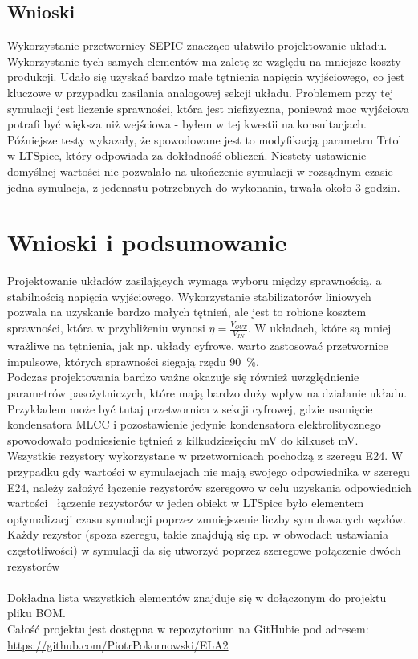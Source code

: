 \documentclass[11pt]{article}
\begin{document}
\subsection{Wnioski}
Wykorzystanie przetwornicy SEPIC znacząco ułatwiło projektowanie układu. Wykorzystanie tych samych elementów ma zaletę ze względu na mniejsze koszty produkcji. Udało się uzyskać bardzo małe tętnienia napięcia wyjściowego, co jest kluczowe w przypadku zasilania analogowej sekcji układu. Problemem przy tej symulacji jest liczenie sprawności, która jest niefizyczna, ponieważ moc wyjściowa potrafi być większa niż wejściowa - byłem w tej kwestii na konsultacjach. Późniejsze testy wykazały, że spowodowane jest to modyfikacją parametru Trtol w LTSpice, który odpowiada za dokładność obliczeń. Niestety ustawienie domyślnej wartości nie pozwalało na ukończenie symulacji w rozsądnym czasie - jedna symulacja, z jedenastu potrzebnych do wykonania, trwała około 3 godzin.

\section{Wnioski i podsumowanie}
Projektowanie układów zasilających wymaga wyboru między sprawnością, a stabilnością napięcia wyjściowego. Wykorzystanie stabilizatorów liniowych pozwala na uzyskanie bardzo małych tętnień, ale jest to robione kosztem sprawności, która w przybliżeniu wynosi $\eta = \frac{V_{OUT}}{V_{IN}}$. W układach, które są mniej wrażliwe na tętnienia, jak np. układy cyfrowe, warto zastosować przetwornice impulsowe, których sprawności sięgają rzędu \SI{90}{\percent}.\\
Podczas projektowania bardzo ważne okazuje się również uwzględnienie parametrów pasożytniczych, które mają bardzo duży wpływ na działanie układu. Przykładem może być tutaj przetwornica z sekcji cyfrowej, gdzie usunięcie kondensatora MLCC i pozostawienie jedynie kondensatora elektrolitycznego spowodowało podniesienie tętnień z kilkudziesięciu mV do kilkuset mV.\\
Wszystkie rezystory wykorzystane w przetwornicach pochodzą z szeregu E24. W przypadku gdy wartości w symulacjach nie mają swojego odpowiednika w szeregu E24, należy założyć łączenie rezystorów szeregowo w celu uzyskania odpowiednich wartości \textemdash \ łączenie rezystorów w jeden obiekt w LTSpice było elementem optymalizacji czasu symulacji poprzez zmniejszenie liczby symulowanych węzłów. Każdy rezystor (spoza szeregu, takie znajdują się np. w obwodach ustawiania częstotliwości) w symulacji da się utworzyć poprzez szeregowe połączenie dwóch rezystorów\\
\\Dokładna lista wszystkich elementów znajduje się w dołączonym do projektu pliku BOM.
\\

\noindent Całość projektu jest dostępna w repozytorium na GitHubie pod adresem:\\ \url{https://github.com/PiotrPokornowski/ELA2}
\end{document}
